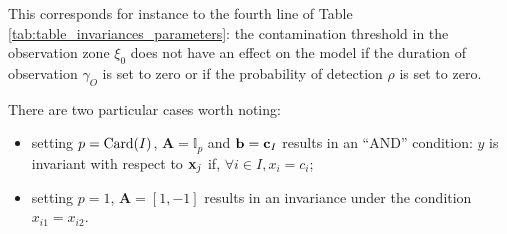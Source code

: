 This corresponds for instance to the fourth line of Table \ref{tab:table_invariances_parameters}: the contamination threshold in the observation zone $\xi_0$  
does not have an effect on the model if the duration of observation $\gamma_O$ is set to zero or if the probability of detection $\rho$ is set to zero.

There are two particular cases worth noting:
\begin{itemize}
 \item setting $p=\operatorname{Card}(I)$, $\mathbf{A} = \mathbb{I}_p$ and $\mathbf{b}=\mathbf{c}_I$ results in an ``AND'' condition: $y$ is invariant with respect to $\mathbf{x}_j$ if, $\forall i \in I, x_i=c_i$;
 \item setting $p=1$, $\mathbf{A}=\left[1, -1 \right]$ results in an invariance under the condition $x_{i1} = x_{i2}$.
\end{itemize}

